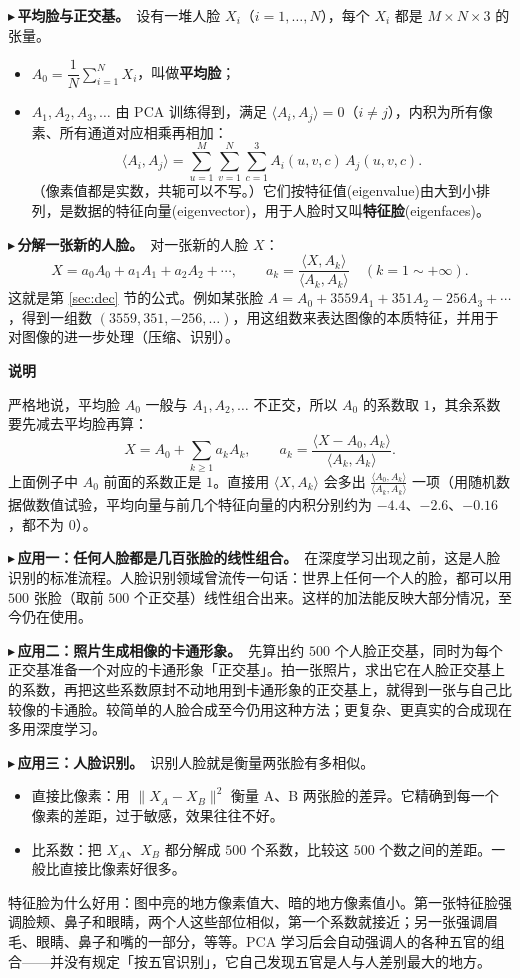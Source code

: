 \documentclass[UTF8,a4paper,11pt]{ctexart}
\newenvironment{note}{\begin{notebox}\textbf{说明}\par\smallskip}{\end{notebox}}
\newcounter{ex}[section]
\newcommand{\point}[1]{\par\addvspace{1ex}\noindent\textcolor{ptteal}{$\blacktriangleright$\,\textbf{#1}}\ }
\begin{document}
\point{平均脸与正交基。}设有一堆人脸 $X_i$（$i=1,\dots,N$），每个 $X_i$ 都是 $M\times N\times3$ 的张量。
\begin{itemize}[nosep]
\item $A_0=\dfrac1N\sum_{i=1}^{N}X_i$，叫做\textbf{平均脸}；
\item $A_1,A_2,A_3,\dots$ 由 PCA 训练得到，满足 $\langle A_i,A_j\rangle=0$（$i\ne j$），内积为所有像素、所有通道对应相乘再相加：
\[
\langle A_i,A_j\rangle=\sum_{u=1}^{M}\sum_{v=1}^{N}\sum_{c=1}^{3}A_i(u,v,c)\,A_j(u,v,c).
\]
（像素值都是实数，共轭可以不写。）它们按特征值(eigenvalue)由大到小排列，是数据的特征向量(eigenvector)，用于人脸时又叫\textbf{特征脸}(eigenfaces)。
\end{itemize}

\point{分解一张新的人脸。}对一张新的人脸 $X$：
\[
X=a_0A_0+a_1A_1+a_2A_2+\cdots,\qquad a_k=\frac{\langle X,A_k\rangle}{\langle A_k,A_k\rangle}\quad(k=1\sim+\infty).
\]
这就是第 \ref{sec:dec} 节的公式。例如某张脸 $A=A_0+3559A_1+351A_2-256A_3+\cdots$，得到一组数 $(3559,351,-256,\dots)$，用这组数来表达图像的本质特征，并用于对图像的进一步处理（压缩、识别）。

\begin{note}
严格地说，平均脸 $A_0$ 一般与 $A_1,A_2,\dots$ 不正交，所以 $A_0$ 的系数取 $1$，其余系数要先减去平均脸再算：
\[
X=A_0+\sum_{k\ge1}a_kA_k,\qquad a_k=\frac{\langle X-A_0,A_k\rangle}{\langle A_k,A_k\rangle}.
\]
上面例子中 $A_0$ 前面的系数正是 $1$。直接用 $\langle X,A_k\rangle$ 会多出 $\frac{\langle A_0,A_k\rangle}{\langle A_k,A_k\rangle}$ 一项（用随机数据做数值试验，平均向量与前几个特征向量的内积分别约为 $-4.4$、$-2.6$、$-0.16$，都不为 $0$）。
\end{note}

\point{应用一：任何人脸都是几百张脸的线性组合。}在深度学习出现之前，这是人脸识别的标准流程。人脸识别领域曾流传一句话：世界上任何一个人的脸，都可以用 $500$ 张脸（取前 $500$ 个正交基）线性组合出来。这样的加法能反映大部分情况，至今仍在使用。

\point{应用二：照片生成相像的卡通形象。}先算出约 $500$ 个人脸正交基，同时为每个正交基准备一个对应的卡通形象「正交基」。拍一张照片，求出它在人脸正交基上的系数，再把这些系数原封不动地用到卡通形象的正交基上，就得到一张与自己比较像的卡通脸。较简单的人脸合成至今仍用这种方法；更复杂、更真实的合成现在多用深度学习。

\point{应用三：人脸识别。}识别人脸就是衡量两张脸有多相似。
\begin{itemize}[nosep]
\item 直接比像素：用 $\|X_A-X_B\|^2$ 衡量 A、B 两张脸的差异。它精确到每一个像素的差距，过于敏感，效果往往不好。
\item 比系数：把 $X_A$、$X_B$ 都分解成 $500$ 个系数，比较这 $500$ 个数之间的差距。一般比直接比像素好很多。
\end{itemize}
特征脸为什么好用：图中亮的地方像素值大、暗的地方像素值小。第一张特征脸强调脸颊、鼻子和眼睛，两个人这些部位相似，第一个系数就接近；另一张强调眉毛、眼睛、鼻子和嘴的一部分，等等。PCA 学习后会自动强调人的各种五官的组合——并没有规定「按五官识别」，它自己发现五官是人与人差别最大的地方。
\end{document}
